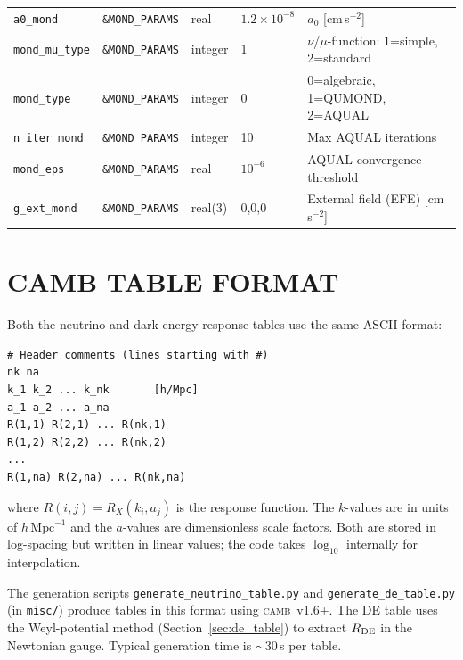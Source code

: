 \documentclass[fleqn,usenatbib]{mnras}
\newcommand{\camb}{\textsc{camb}}
\newcommand{\code}[1]{\texttt{#1}}
\newcommand{\Rde}{R_{\rm DE}}
\newcommand{\azero}{a_0}
\begin{document}
\begin{table}
\begin{tabular}{lllll}
\code{a0\_mond}        & \code{\&MOND\_PARAMS}     & real    & $1.2\times10^{-8}$ & $\azero$ [cm\,s$^{-2}$] \\
\code{mond\_mu\_type}  & \code{\&MOND\_PARAMS}     & integer & 1   & $\nu$/$\mu$-function: 1=simple, 2=standard \\
\code{mond\_type}      & \code{\&MOND\_PARAMS}     & integer & 0   & 0=algebraic, 1=QUMOND, 2=AQUAL \\
\code{n\_iter\_mond}   & \code{\&MOND\_PARAMS}     & integer & 10  & Max AQUAL iterations \\
\code{mond\_eps}       & \code{\&MOND\_PARAMS}     & real    & $10^{-6}$ & AQUAL convergence threshold \\
\code{g\_ext\_mond}    & \code{\&MOND\_PARAMS}     & real(3) & 0,0,0 & External field (EFE) [cm\,s$^{-2}$] \\
\bottomrule
\end{tabular}
\end{table}


\section{CAMB TABLE FORMAT}
\label{app:table_format}

Both the neutrino and dark energy response tables use the same ASCII
format:
\begin{verbatim}
# Header comments (lines starting with #)
nk na
k_1 k_2 ... k_nk       [h/Mpc]
a_1 a_2 ... a_na
R(1,1) R(2,1) ... R(nk,1)
R(1,2) R(2,2) ... R(nk,2)
...
R(1,na) R(2,na) ... R(nk,na)
\end{verbatim}
where $R(i,j) = R_X(k_i, a_j)$ is the response function.  The
$k$-values are in units of $h\,\mathrm{Mpc}^{-1}$ and the $a$-values
are dimensionless scale factors.  Both are stored in log-spacing but
written in linear values; the code takes $\log_{10}$ internally for
interpolation.

The generation scripts \code{generate\_neutrino\_table.py} and
\code{generate\_de\_table.py} (in \code{misc/}) produce tables in
this format using \camb\ v1.6+.  The DE table uses the Weyl-potential
method (Section~\ref{sec:de_table}) to extract $\Rde$ in the
Newtonian gauge.  Typical generation time is ${\sim}30$\,s per table.


\label{lastpage}
\end{document}
